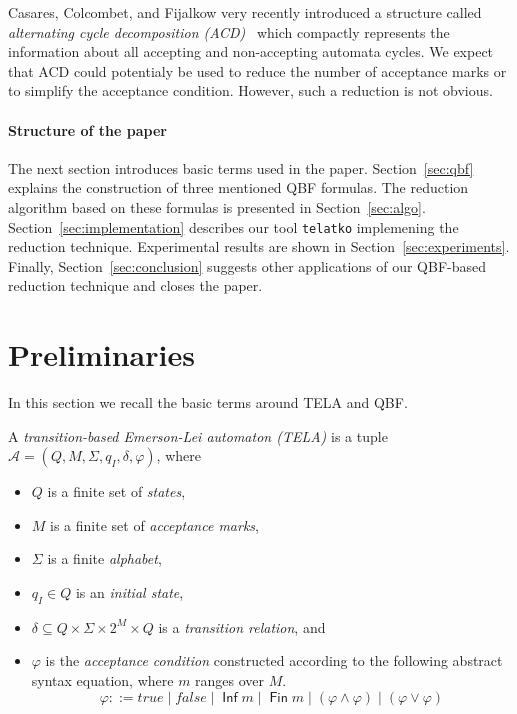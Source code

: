 \documentclass[a4paper,UKenglish,cleveref, autoref, thm-restate]{lipics-v2021}
\DeclareMathOperator{\Inf}{\mathsf{Inf}}
\DeclareMathOperator{\Fin}{\mathsf{Fin}}
\def\false{\mathit{false}}
\def\true{\mathit{true}}
\newcommand{\mA}{\mathcal{A}}
\newcommand{\telatko}{\texttt{telatko}\xspace}
\begin{document}
Casares, Colcombet, and Fijalkow very recently introduced a structure
called \emph{alternating cycle decomposition
  (ACD)}~\cite{casares.21.icalp} which compactly represents the
information about all accepting and non-accepting automata cycles. We
expect that ACD could potentialy be used to reduce the number of
acceptance marks or to simplify the acceptance condition. However,
such a reduction is not obvious.

\paragraph*{Structure of the paper} The next section introduces basic
terms used in the paper. Section~\ref{sec:qbf} explains the
construction of three mentioned QBF formulas. The reduction algorithm
based on these formulas is presented in
Section~\ref{sec:algo}. Section~\ref{sec:implementation} describes our
tool \telatko implemening the reduction technique.
Experimental results are shown in
Section~\ref{sec:experiments}. Finally, Section~\ref{sec:conclusion}
suggests other applications of our QBF-based reduction technique and
closes the paper.


\section{Preliminaries}\label{sec:prelim}

In this section we recall the basic terms around TELA and QBF.

\begin{definition}[TELA]
  A \emph{transition-based Emerson-Lei automaton (TELA)} is a tuple
  $\mA =(Q,M,\Sigma,q_I,\delta,\varphi)$, where
  \begin{itemize}
  \item $Q$ is a finite set of \emph{states},
  \item $M$ is a finite set of \emph{acceptance marks},
  \item $\Sigma$ is a finite \emph{alphabet},
  \item $q_I\in Q$ is an \emph{initial state},
  \item $\delta \subseteq Q \times \Sigma \times 2^{M} \times Q$ is a
    \emph{transition relation}, and
  \item $\varphi$ is the \emph{acceptance condition} constructed
    according to the following abstract syntax equation, where $m$
    ranges over $M$.
    $$\varphi ::= \true \mid \false \mid \Inf m \mid \Fin m \mid \left( \varphi \land \varphi \right) \mid \left( \varphi \lor \varphi \right)$$
\end{itemize}
\end{definition}
\end{document}
